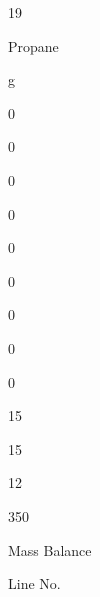 \documentclass[a4paper,portrait,12pt]{article}
\begin{document}
19





\begin{flushleft}
Propane
\end{flushleft}





\begin{flushleft}
g
\end{flushleft}





0





0





0





0





0





0





0





0





0





15





15





12





350





\begin{flushleft}
Mass Balance
\end{flushleft}





\begin{flushleft}
Line No.
\end{flushleft}
\end{document}
